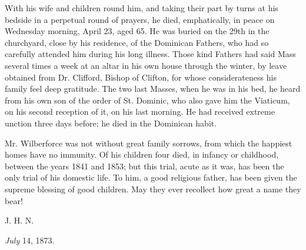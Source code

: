 With his wife and children round him, and taking
their part by turns at his bedside in a perpetual round of prayers, he
died, emphatically, in peace on Wednesday morning, April 23, aged 65.
He was buried on the 29th in the churchyard, close by his residence,
of the Dominican Fathers, who had so carefully attended him during his
long illness. Those kind Fathers had said Mass several times a week at
an altar in his own house through the winter, by leave obtained from
Dr. Clifford, Bishop of Clifton, for whose considerateness his family
feel deep gratitude. The two last Masses, when he was in his bed, he
heard from his own son of the order of St. Dominic, who also gave him
the Viaticum, on his second reception of it, on his last morning. He
had received extreme unction three days before; he died in the
Dominican habit.

Mr. Wilberforce was not without great family
sorrows, from which the happiest homes have no immunity. Of his
children four died, in infancy or childhood, between the years 1841
and 1853; but this trial, acute as it was, has been the only trial of
his domestic life. To him, a good religious father, has been given the
supreme blessing of good children. May they ever recollect how great a
name they bear!

J. H. N.

\emph{July} 14, 1873.
